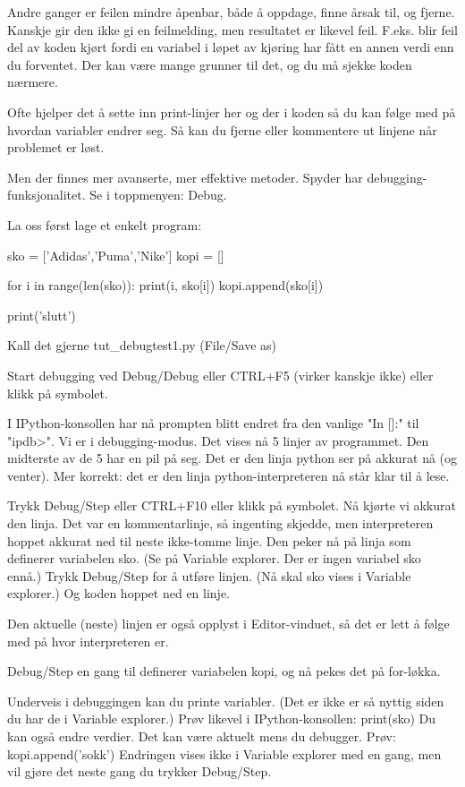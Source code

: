 {Andre ganger er feilen mindre åpenbar, både å oppdage, finne årsak til, og fjerne. 
Kanskje gir den ikke gi en feilmelding, men resultatet er likevel feil. 
F.eks. blir feil del av koden kjørt fordi en variabel 
i løpet av kjøring har fått en annen verdi enn du forventet.
Der kan være mange grunner til det, og du må sjekke koden nærmere. 

Ofte hjelper det å sette inn print-linjer her og der i koden så du kan
følge med på hvordan variabler endrer seg. 
Så kan du fjerne eller kommentere ut linjene når problemet er løst.

Men der finnes mer avanserte, mer effektive metoder.  
Spyder har debugging-funksjonalitet.
Se i toppmenyen: Debug.


La oss først lage et enkelt program:

sko = ['Adidas','Puma','Nike']
kopi = []

for i in range(len(sko)): 
    print(i, sko[i])
    kopi.append(sko[i])

print('slutt')

Kall det gjerne tut_debugtest1.py (File/Save as)



Start debugging ved Debug/Debug eller CTRL+F5 (virker kanskje ikke)
eller klikk på symbolet.

I IPython-konsollen har nå prompten blitt endret fra den vanlige "In []:" til "ipdb>".
Vi er i debugging-modus. 
Det vises nå 5 linjer av programmet. Den midterste av de 5 har en pil på seg.
Det er den linja python ser på akkurat nå (og venter).
Mer korrekt: det er den linja python-interpreteren nå står klar til å lese. 

Trykk Debug/Step eller CTRL+F10 eller klikk på symbolet.
Nå kjørte vi akkurat den linja.
Det var en kommentarlinje, så ingenting skjedde, men interpreteren hoppet akkurat
ned til neste ikke-tomme linje.
Den peker nå på linja som definerer variabelen sko.
(Se på Variable explorer. Der er ingen variabel sko ennå.) 
Trykk Debug/Step for å utføre linjen.
(Nå skal sko vises i Variable explorer.)
Og koden hoppet ned en linje.

Den aktuelle (neste) linjen er også opplyst i Editor-vinduet,
så det er lett å følge med på hvor interpreteren er. 

Debug/Step en gang til definerer variabelen kopi,
og nå pekes det på for-løkka.

Underveis i debuggingen kan du printe variabler. 
(Det er ikke er så nyttig siden du har de i Variable explorer.)
Prøv likevel i IPython-konsollen:
print(sko)
Du kan også endre verdier. Det kan være aktuelt mens du debugger. 
Prøv:
kopi.append('sokk')
Endringen vises ikke i Variable explorer med en gang,
men vil gjøre det neste gang du trykker Debug/Step. 


}
